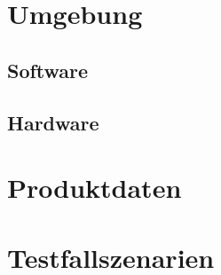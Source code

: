 \documentclass[a4paper]{scrreprt}
\begin{document}
\chapter{Umgebung}
 
\section{Software}
 
\section{Hardware}
 
\chapter{Produktdaten}

\chapter{Testfallszenarien}
 
\end{document}
